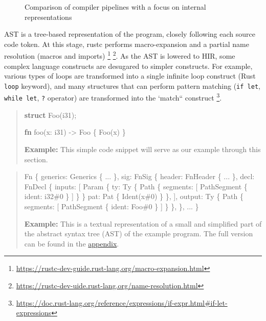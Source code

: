 \documentclass[
  11pt,
  twoside,symmetric]{report}
\newenvironment{Shaded}{}{}
\newcommand{\KeywordTok}[1]{\textbf{#1}}
\newcommand{\NormalTok}[1]{#1}
\newcommand{\OperatorTok}[1]{#1}
\begin{document}
\begin{figure}
\centering

\caption{Comparison of compiler pipelines with a focus on internal
representations}
\end{figure}

AST is a tree-based representation of the program, closely following
each source code token. At this stage, rustc performs macro-expansion
and a partial name resolution (macros and imports)
 \footnote{\url{https://rustc-dev-guide.rust-lang.org/macro-expansion.html}}
\footnote{\url{https://rustc-dev-uide.rust-lang.org/name-resolution.html}}.
As the AST is lowered to HIR, some complex language constructs are
desugared to simpler constructs. For example, various types of loops are
transformed into a single infinite loop construct (Rust \texttt{loop}
keyword), and many structures that can perform pattern matching
(\texttt{if\ let}, \texttt{while\ let}, \texttt{?} operator) are
transformed into the `match``
construct \footnote{\url{https://doc.rust-lang.org/reference/expressions/if-expr.html\#if-let-expressions}}.

\begin{quote}
\begin{Shaded}
\begin{Highlighting}[]
\KeywordTok{struct}\NormalTok{ Foo(i31)}\OperatorTok{;}

\KeywordTok{fn}\NormalTok{ foo(x}\OperatorTok{:}\NormalTok{ i31) }\OperatorTok{{-}\textgreater{}}\NormalTok{ Foo }\OperatorTok{\{}
\NormalTok{    Foo(x)}
\OperatorTok{\}}
\end{Highlighting}
\end{Shaded}

\textbf{Example:} This simple code snippet will serve as our example
through this section.
\end{quote}

\begin{quote}
\begin{Shaded}
\begin{Highlighting}[]
\NormalTok{Fn \{}
\NormalTok{  generics: Generics \{ ... \},}
\NormalTok{  sig: FnSig \{}
\NormalTok{    header: FnHeader \{ ... \},}
\NormalTok{      decl: FnDecl \{}
\NormalTok{        inputs: [}
\NormalTok{          Param \{}
\NormalTok{            ty: Ty \{}
\NormalTok{              Path \{ segments: [ PathSegment \{ ident: i32\#0 \} ] \}}
\NormalTok{            \}}
\NormalTok{            pat: Pat \{ Ident(x\#0) \}}
\NormalTok{          \},}
\NormalTok{        ],}
\NormalTok{        output: Ty \{}
\NormalTok{            Path \{ segments: [ PathSegment \{ ident: Foo\#0 \} ]}
\NormalTok{        \}}
\NormalTok{      \},}
\NormalTok{  \},}
\NormalTok{  ... }
\NormalTok{\}}
\end{Highlighting}
\end{Shaded}

\textbf{Example:} This is a textual representation of a small and
simplified part of the abstract syntax tree (AST) of the example
program. The full version can be found in the
\hyperref[abstract-syntax-tree-ast]{appendix}.
\end{quote}
\end{document}
